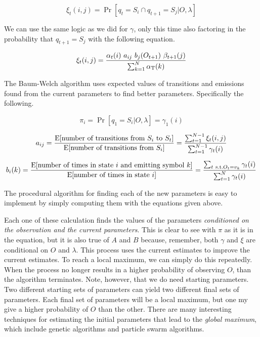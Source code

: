 \begin{equation}
  \xi_t(i,j) = \Pr[q_t = S_i \cap q_{t+1} = S_j \vert O,\lambda]
\end{equation}

We can use the same logic as we did for $\gamma$, only this time also
factoring in the probability that $q_{t+1} = S_j$ with the following
equation.

\begin{equation}
  \xi_t(i,j) = \frac{\alpha_t(i)\ a_{ij}\ b_j(O_{t+1})\
  \beta_{t+1}(j)}{\sum_{k=1}^N \alpha_\Tau(k)}
\end{equation}

The Baum-Welch algorithm uses expected values of transitions and
emissions found from the current parameters to find better parameters.
Specifically the following. \cite{Rabiner89}

\begin{equation}
  \pi_i = \Pr[q_1 = S_i \vert O,\lambda] = \gamma_1(i)
\end{equation}

\begin{equation}
  a_{ij} = \frac{\mathrm{E}[\textrm{number of transitions from $S_i$ to
  $S_t$}]}{\mathrm{E}[\textrm{number of transitions from $S_i$}]} =
  \frac{\sum_{t=1}^{N-1} \xi_t(i,j)}{\sum_{t=1}^{N-1} \gamma_t(i)}
\end{equation}

\begin{equation}
  b_i(k) = \frac{\E[\textrm{number of times in state $i$ and emitting symbol
  $k$}]}{\E[\textrm{number of times in state $i$}]} = \frac{\sum_{t\ \textrm{s.t.} O_t = v_k} \gamma_t(i)}{\sum_{t=1}^N \gamma_t(i)}
\end{equation}

The procedural algorithm for finding each of the new parameters is easy
to implement by simply computing them with the equations given above.

Each one of these calculation finds the values of the parameters
\emph{conditioned on the observation and the current parameters}.
This is clear to see with $\pi$ as it is in the equation, but it is
also true of $A$ and $B$ because, remember, both $\gamma$ and $\xi$
are conditional on $O$ and $\lambda$. This process uses the current
estimates to improve the current estimates. To reach a local maximum,
we can simply do this repeatedly. When the process no longer results in
a higher probability of observing $O$, than the algorithm terminates.
Note, however, that we do need starting parameters. Two different
starting sets of parameters can yield two different final sets of parameters. Each final
set of parameters will be a local maximum, but one my give a higher
probability of $O$ than the other. There are many interesting techniques
for estimating the initial parameters that lead to the \emph{global
maximum}, which include genetic algorithms and particle swarm
algorithms. \cite{fang2012investigation}
